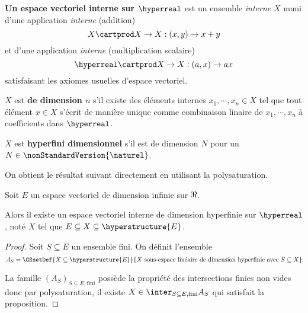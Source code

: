 \begin{definition}
	\textbf{Un espace vectoriel interne sur $\hyperreal$} est un ensemble
	\textit{interne} $X$ muni d'une application \textit{interne} (addition)
	\begin{equation}
		X \cartprod X \rightarrow X : (x, y) \rightarrow x + y
	\end{equation}
	et d'une application \textit{interne} (multiplication scalaire)
	\begin{equation}
		\hyperreal \cartprod X \rightarrow X : (a, x) \rightarrow ax
	\end{equation}
	satisfaisant les axiomes usuelles d'espace vectoriel.

	$X$ est \textbf{de dimension $n$} s'il existe des éléments internes $x_{1},
	\cdots, x_{n} \in X$ tel que tout élément $x \in X$ s'écrit de manière
	unique comme combinaison linaire de $x_{1}, \cdots, x_{n}$ à coefficients
	dans $\hyperreal$.

	$X$ est \textbf{hyperfini dimensionnel} s'il est de dimension $N$ pour un $N
	\in \nonStandardVersion{\naturel}$.
\end{definition}


On obtient le résultat suivant directement en utilisant la polysaturation.

\begin{proposition}
	Soit $E$ un espace vectoriel de dimension infinie sur $\real$.

	Alors il existe un espace vectoriel interne de dimension hyperfinie sur
	$\hyperreal$, noté $X$ tel que $E \subseteq X \subseteq \hyperstructure{E}$.
\end{proposition}

\ifdefined\outputproof
\begin{proof}
	Soit $S \subseteq E$ un ensemble fini. On définit l'ensemble
	\begin{equation}
		A_{S} = \GSsetDef{X \subseteq \hyperstructure{E}}{X \text{ sous-espace
		linéaire de dimension hyperfinie avec } S \subseteq X}
	\end{equation}

	La famille $(A_{S})_{S \subseteq E, \text{fini}}$ possède la propriété des
	intersections finies non vides donc par polysaturation, il existe $X \in
	\inter_{S \subseteq E, \text{fini}} A_{S}$ qui satisfait la proposition.
\end{proof}
\fi
